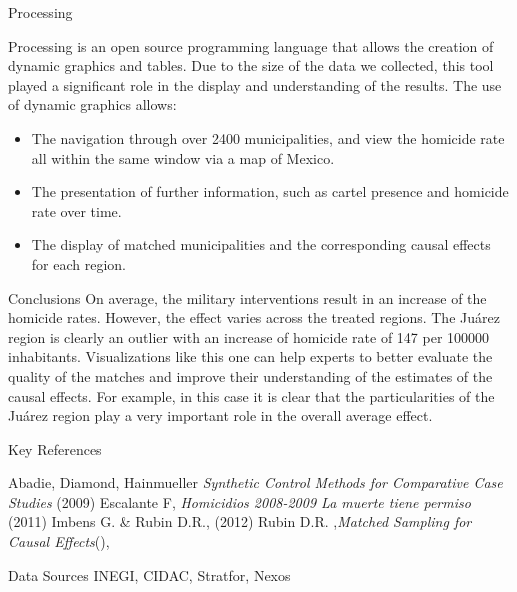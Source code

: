 \documentclass[final]{beamer}
\newlength{\sepwid}
\newlength{\onecolwid}
\begin{document}
\begin{frame}[t]
\begin{columns}[t]
\begin{column}{\onecolwid}
\begin{block}{Processing}
\begin{figure}[htdp]
{          }
        \end{figure}
	Processing is an open source programming language that allows the creation of dynamic graphics and tables. Due to the size of the data we collected, this tool played a significant role in the display and understanding of the results. The use of dynamic graphics allows:
        \begin{itemize}
          \item The navigation through over 2400 municipalities, and view the homicide rate all within the same window via a map of Mexico.
          \item The presentation of further information, such as cartel presence and homicide rate over time.
          \item The display of matched municipalities and the corresponding causal effects for each region.
        \end{itemize}		
      \end{block}
      \begin{block}{Conclusions}
 	On average, the military interventions result in an increase of the homicide rates. However, the effect varies across the treated regions. The Ju\'{a}rez region is clearly an outlier with an increase of homicide rate of 147 per 100000 inhabitants. 
       Visualizations like this one can help experts to better evaluate the quality of the matches and improve their understanding of the estimates of the causal effects. For example, in this case it is clear that the particularities of the Ju\'{a}rez region play a very important role in the overall average effect. 
      \end{block}
      \begin{block}{Key References }

        
	\vspace{-0.5cm}
        \footnotesize{\begin{thebibliography}{99}
           Abadie, Diamond, Hainmueller  \emph{Synthetic Control Methods for Comparative Case Studies} (2009)
           Escalante F, \emph{Homicidios 2008-2009 La muerte tiene permiso} (2011)
           Imbens G. \& Rubin D.R., (2012)
           Rubin D.R. ,\emph{Matched Sampling for Causal Effects}(),
          \end{thebibliography}}        
      \end{block}

	      \begin{block}{Data Sources}
		\centering
	       \small{INEGI, CIDAC, Stratfor, Nexos}
	      \end{block}
    \end{column}
  \end{columns}
\end{frame}
\end{document}
